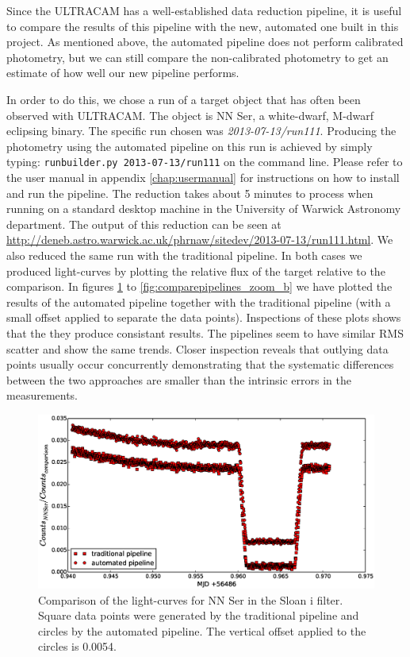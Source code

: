 Since the ULTRACAM has a well-established data reduction pipeline, it is useful to compare the results of this pipeline with the new, automated one built in this project. As mentioned above, the automated pipeline does not perform calibrated photometry, but we can still compare the non-calibrated photometry to get an estimate of how well our new pipeline performs.

In order to do this, we chose a run of a target object that has often been observed with ULTRACAM. The object is NN Ser, a white-dwarf, M-dwarf eclipsing binary. The specific run chosen was \emph{2013-07-13/run111}. Producing the photometry using the automated pipeline on this run is achieved by simply typing: \texttt{runbuilder.py 2013-07-13/run111} on the command line. Please refer to the user manual in appendix \ref{chap:usermanual} for instructions on how to install and run the pipeline.  The reduction takes about 5 minutes to process when running on a standard desktop machine in the University of Warwick Astronomy department. The output of this reduction can be seen at \url{http://deneb.astro.warwick.ac.uk/phrnaw/sitedev/2013-07-13/run111.html}. We also reduced the same run with the traditional pipeline. In both cases we produced light-curves by plotting the relative flux of the target relative to the comparison. In figures \ref{fig:comparepipelines_r} to \ref{fig:comparepipelines_zoom_b} we have plotted the results of the automated pipeline together with the traditional pipeline (with a small offset applied to separate the data points). Inspections of these plots shows that the they produce consistant results. The pipelines seem to have similar RMS scatter and show the same trends. Closer inspection reveals that outlying data points usually occur concurrently demonstrating that the systematic differences between the two approaches are smaller than the intrinsic errors in the measurements. 

\begin{figure}
\centering
\includegraphics[width=140mm]{images/nn_ser_compare_r.eps}
\caption{Comparison of the light-curves for NN Ser in the Sloan i filter. Square data points were generated by the traditional pipeline and circles by the automated pipeline. The vertical offset applied to the circles is 0.0054. }
\label{fig:comparepipelines_r}
\end{figure}


